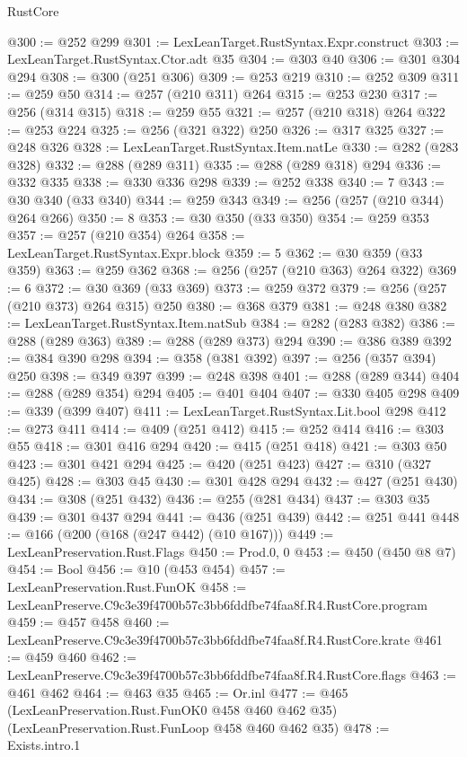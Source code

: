 \begin{lexlean}{RustCore}
\begin{coremodule}
@300 := @252 @299
@301 := LexLeanTarget.RustSyntax.Expr.construct
@303 := LexLeanTarget.RustSyntax.Ctor.adt @35
@304 := @303 @40
@306 := @301 @304 @294
@308 := @300 (@251 @306)
@309 := @253 @219
@310 := @252 @309
@311 := @259 @50
@314 := @257 (@210 @311) @264
@315 := @253 @230
@317 := @256 (@314 @315)
@318 := @259 @55
@321 := @257 (@210 @318) @264
@322 := @253 @224
@325 := @256 (@321 @322) @250
@326 := @317 @325
@327 := @248 @326
@328 := LexLeanTarget.RustSyntax.Item.natLe
@330 := @282 (@283 @328)
@332 := @288 (@289 @311)
@335 := @288 (@289 @318) @294
@336 := @332 @335
@338 := @330 @336 @298
@339 := @252 @338
@340 := 7
@343 := @30 @340 (@33 @340)
@344 := @259 @343
@349 := @256 (@257 (@210 @344) @264 @266)
@350 := 8
@353 := @30 @350 (@33 @350)
@354 := @259 @353
@357 := @257 (@210 @354) @264
@358 := LexLeanTarget.RustSyntax.Expr.block
@359 := 5
@362 := @30 @359 (@33 @359)
@363 := @259 @362
@368 := @256 (@257 (@210 @363) @264 @322)
@369 := 6
@372 := @30 @369 (@33 @369)
@373 := @259 @372
@379 := @256 (@257 (@210 @373) @264 @315) @250
@380 := @368 @379
@381 := @248 @380
@382 := LexLeanTarget.RustSyntax.Item.natSub
@384 := @282 (@283 @382)
@386 := @288 (@289 @363)
@389 := @288 (@289 @373) @294
@390 := @386 @389
@392 := @384 @390 @298
@394 := @358 (@381 @392)
@397 := @256 (@357 @394) @250
@398 := @349 @397
@399 := @248 @398
@401 := @288 (@289 @344)
@404 := @288 (@289 @354) @294
@405 := @401 @404
@407 := @330 @405 @298
@409 := @339 (@399 @407)
@411 := LexLeanTarget.RustSyntax.Lit.bool @298
@412 := @273 @411
@414 := @409 (@251 @412)
@415 := @252 @414
@416 := @303 @55
@418 := @301 @416 @294
@420 := @415 (@251 @418)
@421 := @303 @50
@423 := @301 @421 @294
@425 := @420 (@251 @423)
@427 := @310 (@327 @425)
@428 := @303 @45
@430 := @301 @428 @294
@432 := @427 (@251 @430)
@434 := @308 (@251 @432)
@436 := @255 (@281 @434)
@437 := @303 @35
@439 := @301 @437 @294
@441 := @436 (@251 @439)
@442 := @251 @441
@448 := @166 (@200 (@168 (@247 @442) (@10 @167)))
@449 := LexLeanPreservation.Rust.Flags
@450 := Prod.{0, 0}
@453 := @450 (@450 @8 @7)
@454 := Bool
@456 := @10 (@453 @454)
@457 := LexLeanPreservation.Rust.FunOK
@458 := LexLeanPreserve.C9c3e39f4700b57c3bb6fddfbe74faa8f.R4.RustCore.program
@459 := @457 @458
@460 := LexLeanPreserve.C9c3e39f4700b57c3bb6fddfbe74faa8f.R4.RustCore.krate
@461 := @459 @460
@462 := LexLeanPreserve.C9c3e39f4700b57c3bb6fddfbe74faa8f.R4.RustCore.flags
@463 := @461 @462
@464 := @463 @35
@465 := Or.inl
@477 := @465
    (LexLeanPreservation.Rust.FunOK0 @458 @460 @462 @35)
    (LexLeanPreservation.Rust.FunLoop @458 @460 @462 @35)
@478 := Exists.intro.{1}

\end{coremodule}
\end{lexlean}
